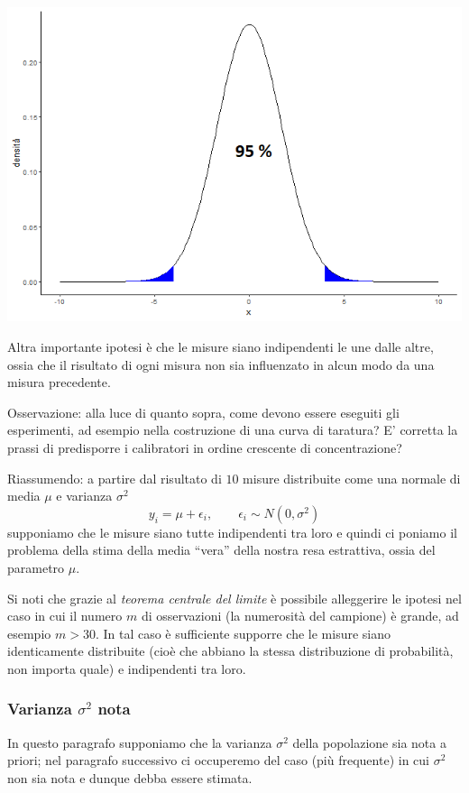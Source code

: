 \documentclass[
  11pt,
]{book}
\begin{document}
\begin{center}\includegraphics[width=0.5\linewidth]{Immagini/Inferenziale/probamis} \end{center}

Altra importante ipotesi è che le misure siano indipendenti le une dalle altre, ossia che il risultato di ogni misura non sia influenzato in alcun modo da una misura precedente.

Osservazione: alla luce di quanto sopra, come devono essere eseguiti gli esperimenti, ad esempio nella costruzione di una curva di taratura?
E' corretta la prassi di predisporre i calibratori in ordine crescente di concentrazione?

Riassumendo: a partire dal risultato di \(10\) misure distribuite come una normale di media \(\mu\) e varianza \(\sigma^2\)
\[
y_i=\mu+\epsilon_i, \qquad \epsilon_i \sim N(0,\sigma^2)
\]
supponiamo che le misure siano tutte indipendenti tra loro e quindi ci poniamo il problema della stima della media ``vera'' della nostra resa estrattiva, ossia del parametro \(\mu\).

Si noti che grazie al \emph{teorema centrale del limite} è possibile alleggerire le ipotesi nel caso in cui il numero \(m\) di osservazioni (la numerosità del campione) è grande, ad esempio \(m>30\). In tal caso è sufficiente supporre che le misure siano identicamente distribuite (cioè che abbiano la stessa distribuzione di probabilità, non importa quale) e indipendenti tra loro.

\hypertarget{varianza-sigma2-nota}{%
\subsubsection{\texorpdfstring{Varianza \(\sigma^2\) nota}{Varianza \textbackslash sigma\^{}2 nota}}\label{varianza-sigma2-nota}}

In questo paragrafo supponiamo che la varianza \(\sigma^2\) della popolazione sia nota a priori; nel paragrafo successivo ci occuperemo del caso (più frequente) in cui \(\sigma^2\) non sia nota e dunque debba essere stimata.
\end{document}
